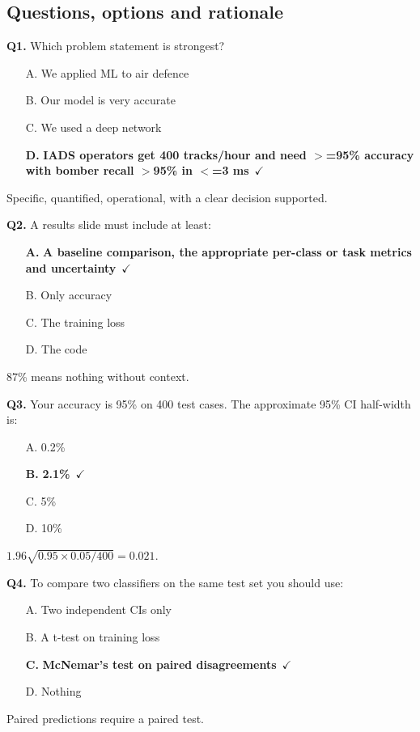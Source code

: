 \documentclass[11pt]{article}
\begin{document}
\subsection*{Questions, options and rationale}

{\small

\noindent\textbf{Q1.} Which problem statement is strongest?\begin{itemize}[leftmargin=2.2em,itemsep=0pt,topsep=1pt]\item[A.] We applied ML to air defence\item[B.] Our model is very accurate\item[C.] We used a deep network\item[\textbf{D.}] \textbf{IADS operators get 400 tracks/hour and need $>$=95\% accuracy with bomber recall $>$95\% in $<$=3 ms}~{\color{GrnN}$\checkmark$}\end{itemize} Specific, quantified, operational, with a clear decision supported.\par\medskip

\noindent\textbf{Q2.} A results slide must include at least:\begin{itemize}[leftmargin=2.2em,itemsep=0pt,topsep=1pt]\item[\textbf{A.}] \textbf{A baseline comparison, the appropriate per-class or task metrics and uncertainty}~{\color{GrnN}$\checkmark$}\item[B.] Only accuracy\item[C.] The training loss\item[D.] The code\end{itemize} 87\% means nothing without context.\par\medskip

\noindent\textbf{Q3.} Your accuracy is 95\% on 400 test cases. The approximate 95\% CI half-width is:\begin{itemize}[leftmargin=2.2em,itemsep=0pt,topsep=1pt]\item[A.] 0.2\%\item[\textbf{B.}] \textbf{2.1\%}~{\color{GrnN}$\checkmark$}\item[C.] 5\%\item[D.] 10\%\end{itemize} $1.96\sqrt{0.95\times0.05/400}=0.021$.\par\medskip

\noindent\textbf{Q4.} To compare two classifiers on the same test set you should use:\begin{itemize}[leftmargin=2.2em,itemsep=0pt,topsep=1pt]\item[A.] Two independent CIs only\item[B.] A t-test on training loss\item[\textbf{C.}] \textbf{McNemar's test on paired disagreements}~{\color{GrnN}$\checkmark$}\item[D.] Nothing\end{itemize} Paired predictions require a paired test.\par\medskip

}
\end{document}
